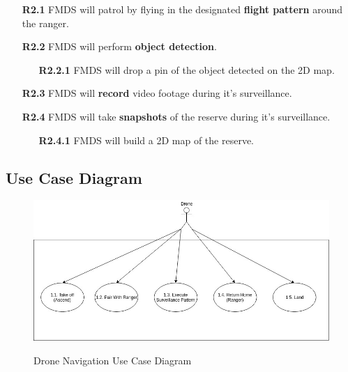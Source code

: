\begin{flushleft}
\begin{itemize}
				\begin{itemize}
					\item [\textbf{R2.1}] FMDS will patrol by flying in the designated \textbf{flight pattern} around the ranger.
					\item [\textbf{R2.2}] FMDS will perform \textbf{object detection}.
						\begin{itemize}
							\item [\textbf{R2.2.1}] FMDS will drop a pin of the object detected on the 2D map.
						\end{itemize}
					\item [\textbf{R2.3}] FMDS will \textbf{record} video footage during it's surveillance.
					\item [\textbf{R2.4}] FMDS will take \textbf{snapshots} of the reserve during it's surveillance.
						\begin{itemize}
							\item [\textbf{R2.4.1}] FMDS will build a 2D map of the reserve.
						\end{itemize}
				\end{itemize}
		\end{itemize}
	\end{flushleft}

\subsection{Use Case Diagram}
\begin{center}
	\begin{flushleft}
		\begin{figure}[h!]
			\centering
			\includegraphics[scale=0.5]{./assets/images/navigation-ucd.jpg}
			\label{fig: object-recognition-ucd }
			\caption{Drone Navigation Use Case Diagram}
		\end{figure}

	\end{flushleft}
\end{center}
